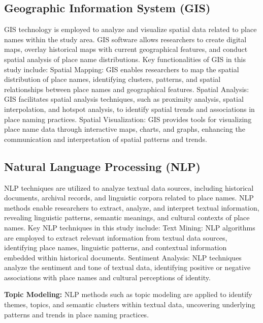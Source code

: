 \subsection*{Geographic Information System (GIS)}
GIS technology is employed to analyze and visualize spatial data related to place names within the study area. GIS software allows researchers to create digital maps, overlay historical maps with current geographical features, and conduct spatial analysis of place name distributions. Key functionalities of GIS in this study include:
Spatial Mapping: GIS enables researchers to map the spatial distribution of place names, identifying clusters, patterns, and spatial relationships between place names and geographical features.
Spatial Analysis: GIS facilitates spatial analysis techniques, such as proximity analysis, spatial interpolation, and hotspot analysis, to identify spatial trends and associations in place naming practices.
Spatial Visualization: GIS provides tools for visualizing place name data through interactive maps, charts, and graphs, enhancing the communication and interpretation of spatial patterns and trends.
\subsection*{Natural Language Processing (NLP)}
NLP techniques are utilized to analyze textual data sources, including historical documents, archival records, and linguistic corpora related to place names. NLP methods enable researchers to extract, analyze, and interpret textual information, revealing linguistic patterns, semantic meanings, and cultural contexts of place names. Key NLP techniques in this study include:
Text Mining: NLP algorithms are employed to extract relevant information from textual data sources, identifying place names, linguistic patterns, and contextual information embedded within historical documents.
Sentiment Analysis: NLP techniques analyze the sentiment and tone of textual data, identifying positive or negative associations with place names and cultural perceptions of identity.

\textbf{Topic Modeling:} NLP methods such as topic modeling are applied to identify themes, topics, and semantic clusters within textual data, uncovering underlying patterns and trends in place naming practices.

